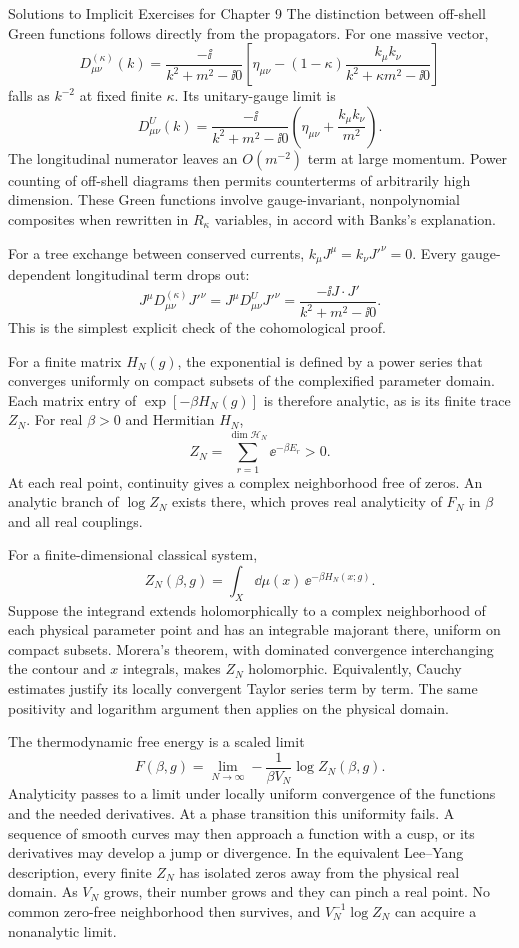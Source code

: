 \begin{bankssolutions}{Solutions to Implicit Exercises for Chapter 9}
The distinction between off-shell Green functions follows directly from the
propagators.  For one massive vector,
\[
  D^{(\kappa)}_{\mu\nu}(k)=
  \frac{-\ii}{k^2+m^2-\ii0}
  \left[\eta_{\mu\nu}-(1-\kappa)
  \frac{k_\mu k_\nu}{k^2+\kappa m^2-\ii0}\right]
\]
falls as $k^{-2}$ at fixed finite $\kappa$.  Its unitary-gauge limit is
\[
  D^U_{\mu\nu}(k)=
  \frac{-\ii}{k^2+m^2-\ii0}
  \left(\eta_{\mu\nu}+\frac{k_\mu k_\nu}{m^2}\right).
\]
The longitudinal numerator leaves an $O(m^{-2})$ term at large momentum.
Power counting of off-shell diagrams then permits counterterms of arbitrarily
high dimension.  These Green functions involve gauge-invariant, nonpolynomial
composites when rewritten in $R_\kappa$ variables, in accord with Banks's
explanation.

For a tree exchange between conserved currents, $k_\mu J^\mu=k_\nu J'^\nu=0$.
Every gauge-dependent longitudinal term drops out:
\[
  J^\mu D^{(\kappa)}_{\mu\nu}J'^\nu
  =J^\mu D^U_{\mu\nu}J'^\nu
  =\frac{-\ii J\mathbin{\cdot}J'}{k^2+m^2-\ii0}.
\]
This is the simplest explicit check of the cohomological proof.

For a finite matrix $H_N(g)$, the exponential is defined by a power series
that converges uniformly on compact subsets of the complexified parameter
domain.  Each matrix entry of $\exp[-\beta H_N(g)]$ is therefore analytic, as
is its finite trace $Z_N$.  For real $\beta>0$ and Hermitian $H_N$,
\[
  Z_N=\sum_{r=1}^{\dim\mathcal H_N}\ee^{-\beta E_r}>0.
\]
At each real point, continuity gives a complex neighborhood free of zeros.
An analytic branch of $\log Z_N$ exists there, which proves real analyticity
of $F_N$ in $\beta$ and all real couplings.

For a finite-dimensional classical system,
\[
  Z_N(\beta,g)=\int_X\dd\mu(x)\,\ee^{-\beta H_N(x;g)}.
\]
Suppose the integrand extends holomorphically to a complex neighborhood of
each physical parameter point and has an integrable majorant there, uniform on
compact subsets.  Morera's theorem, with dominated convergence interchanging
the contour and $x$ integrals, makes $Z_N$ holomorphic.  Equivalently, Cauchy
estimates justify its locally convergent Taylor series term by term.  The same
positivity and logarithm argument then applies on the physical domain.

The thermodynamic free energy is a scaled limit
\[
  F(\beta,g)=\lim_{N\to\infty}
  -\frac{1}{\beta V_N}\log Z_N(\beta,g).
\]
Analyticity passes to a limit under locally uniform convergence of the
functions and the needed derivatives.  At a phase transition this uniformity
fails.  A sequence of smooth curves may then approach a function with a cusp,
or its derivatives may develop a jump or divergence.  In the equivalent
Lee--Yang description, every finite $Z_N$ has isolated zeros away from the
physical real domain.  As $V_N$ grows, their number grows and they can pinch a
real point.  No common zero-free neighborhood then survives, and
$V_N^{-1}\log Z_N$ can acquire a nonanalytic limit.


\end{bankssolutions}
